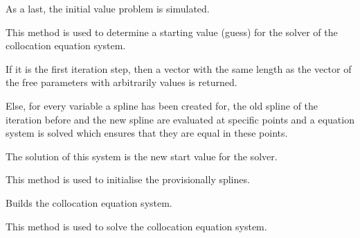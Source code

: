\documentclass[letterpaper,10pt,english]{sphinxmanual}
\begin{document}
\begin{fulllineitems}
\begin{fulllineitems}
As a last, the initial value problem is simulated.

\end{fulllineitems}


\begin{fulllineitems}
\label{pytrajectory:pytrajectory.trajectory.Trajectory.getGuess}
This method is used to determine a starting value (guess) for the
solver of the collocation equation system.

If it is the first iteration step, then a vector with the same length as
the vector of the free parameters with arbitrarily values is returned.

Else, for every variable a spline has been created for, the old spline
of the iteration before and the new spline are evaluated at specific
points and a equation system is solved which ensures that they are equal
in these points.

The solution of this system is the new start value for the solver.

\end{fulllineitems}


\begin{fulllineitems}
\label{pytrajectory:pytrajectory.trajectory.Trajectory.initSplines}
This method is used to initialise the provisionally splines.

\end{fulllineitems}


\begin{fulllineitems}
\label{pytrajectory:pytrajectory.trajectory.Trajectory.buildEQS}
Builds the collocation equation system.

\end{fulllineitems}


\begin{fulllineitems}
\label{pytrajectory:pytrajectory.trajectory.Trajectory.solveEQS}
This method is used to solve the collocation equation system.


\end{fulllineitems}
\end{fulllineitems}
\end{document}
